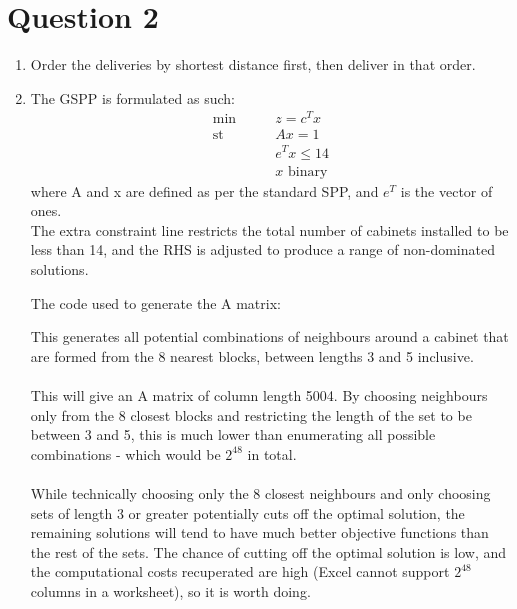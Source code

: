 \documentclass[10pt,a4paper]{article}
\begin{document}
\section*{Question 2}
\begin{enumerate}
\item
Order the deliveries by shortest distance first, then deliver in that order.

\item 
The GSPP is formulated as such:
\begin{align*}
\text{min}& \qquad z = c^Tx \\
\text{st}& \qquad Ax = 1 \\
& \qquad e^Tx \leq 14 \\
& \qquad x \text{  binary}
\end{align*}
where A and x are defined as per the standard SPP, and \(e^T\) is the vector of ones.\\
The extra constraint line restricts the total number of cabinets installed to be less than 14, and the RHS is adjusted to produce a range of non-dominated solutions.

The code used to generate the A matrix:

This generates all potential combinations of neighbours around a cabinet that are formed from the 8 nearest blocks, between lengths 3 and 5 inclusive. \\ \\
This will give an A matrix of column length 5004. By choosing neighbours only from the 8 closest blocks and restricting the length of the set to be between 3 and 5, this is much lower than enumerating all possible combinations - which would be \(2^{48}\) in total. \\ \\
While technically choosing only the 8 closest neighbours and only choosing sets of length 3 or greater potentially cuts off the optimal solution, the remaining solutions will tend to have much better objective functions than the rest of the sets. The chance of cutting off the optimal solution is low, and the computational costs recuperated are high (Excel cannot support \(2^{48}\) columns in a worksheet), so it is worth doing.


\end{enumerate}
\end{document}
